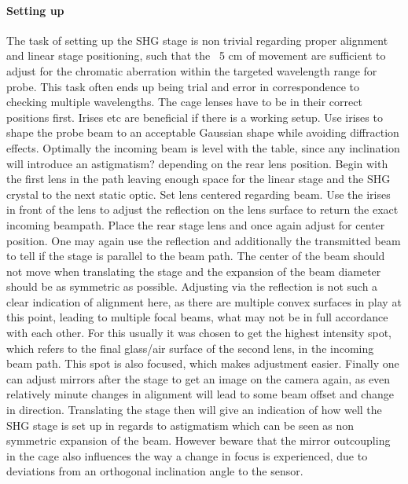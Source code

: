 \documentclass[twoside,openright]{scrreprt}
\begin{document}
\paragraph{Setting up}
The task of setting up the SHG stage is non trivial regarding proper alignment and linear stage positioning, such that the ~5 cm of movement are sufficient to adjust for the chromatic aberration within the targeted wavelength range for probe. This task often ends up being trial and error in correspondence to checking multiple wavelengths. The cage lenses have to be in their correct positions first.\newline
Irises etc are beneficial if there is a working setup.\newline
Use irises to shape the probe beam to an acceptable Gaussian shape while avoiding diffraction effects. Optimally the incoming beam is level with the table, since any inclination will introduce an astigmatism? depending on the rear lens position.\newline
Begin with the first lens in the path leaving enough space for the linear stage and the SHG crystal to the next static optic. Set lens centered regarding beam. Use the irises in front of the lens to adjust the reflection on the lens surface to return the exact incoming beampath.\newline
Place the rear stage lens and once again adjust for center position. One may again use the reflection and additionally the transmitted beam to tell if the stage is parallel to the beam path. The center of the beam should not move when translating the stage and the expansion of the beam diameter should be as symmetric as possible. Adjusting via the reflection is not such a clear indication of alignment here, as there are multiple convex surfaces in play at this point, leading to multiple focal beams, what may not be in full accordance with each other. For this usually it was chosen to get the highest intensity spot, which refers to the final glass/air surface of the second lens, in the incoming beam path. This spot is also focused, which makes adjustment easier.\newline
Finally one can adjust mirrors after the stage to get an image on the camera again, as even relatively minute changes in alignment will lead to some beam offset and change in direction. Translating the stage then will give an indication of how well the SHG stage is set up in regards to astigmatism which can be seen as non symmetric expansion of the beam. However beware that the mirror outcoupling in the cage also influences the way a change in focus is experienced, due to deviations from an orthogonal inclination angle to the sensor.
\end{document}
